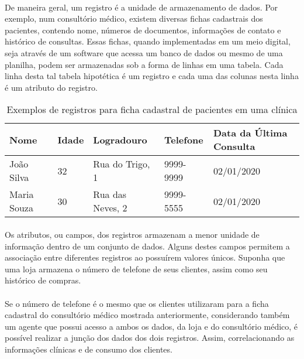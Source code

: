 \paragraph{} De maneira geral, um registro é a unidade de armazenamento de dados. Por exemplo, num consultório médico, existem
diversas fichas cadastrais dos pacientes, contendo nome, números de documentos, informações de contato e histórico de consultas. Essas fichas, quando implementadas em um meio digital, seja através de um software que acessa um banco de dados ou mesmo de uma planilha, podem ser armazenadas sob a forma de linhas em uma tabela. Cada linha desta tal tabela hipotética é um registro e cada uma das colunas nesta linha é um atributo do registro.

\begin{table}[ht]
    \caption{Exemplos de registros para ficha cadastral de pacientes em uma clínica}
    \label{table:registros}
    \begin{center}
        \begin{tabular}{| l | l | l | l | l |}
        \hline
        Nome & Idade & Logradouro & Telefone & Data da Última Consulta \\ \hline
        João Silva & 32 & Rua do Trigo, 1 & 9999-9999 & 02/01/2020 \\ \hline
        Maria Souza & 30 & Rua das Neves, 2 & 9999-5555 & 02/01/2020 \\ \hline
        \hline
        \end{tabular}
    \end{center}
\end{table}

\paragraph{} Os atributos, ou campos, dos registros armazenam a menor unidade de informação dentro de um conjunto de dados.
Alguns destes campos permitem a associação entre diferentes registros ao possuírem valores únicos.
Suponha que uma loja armazena o número de telefone 
de seus clientes, assim como seu histórico de compras. 

\paragraph{} Se o número de telefone é o mesmo que os clientes utilizaram para a ficha cadastral do consultório 
médico mostrada anteriormente, considerando também um agente que possui acesso a ambos os dados, da loja e do 
consultório médico, é possível realizar a junção dos dados dos dois registros. Assim, correlacionando as informações clínicas e de consumo dos clientes.

